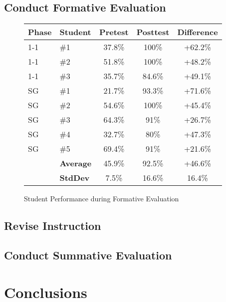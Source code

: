 \documentclass{sig-alternate}
\begin{document}
\subsection{Conduct Formative Evaluation}

\begin{figure}
\begin{tabular}{l|l|c|c|c}
	Phase & Student & Pretest & Posttest & Difference\\\hline
	1-1 & \#1 & 37.8\% & 100\% & +62.2\%\\
	1-1 & \#2 & 51.8\% & 100\% & +48.2\%\\
	1-1 & \#3 & 35.7\% & 84.6\% & +49.1\%\\\hline
	SG & \#1 & 21.7\% & 93.3\% & +71.6\%\\
	SG & \#2 & 54.6\% & 100\% & +45.4\%\\
	SG & \#3 & 64.3\% & 91\% & +26.7\%\\
	SG & \#4 & 32.7\% & 80\% & +47.3\%\\
	SG & \#5 & 69.4\% & 91\% & +21.6\%\\\hline
	& \textbf{Average} & 45.9\% & 92.5\% & +46.6\%\\
	& \textbf{StdDev} & 7.5\% & 16.6\% & 16.4\%\\
\end{tabular}
\caption{Student Performance during Formative Evaluation}
\label{fe-results}
\end{figure}

\subsection{Revise Instruction}
\subsection{Conduct Summative Evaluation}

\section{Conclusions}




 
\end{document}
